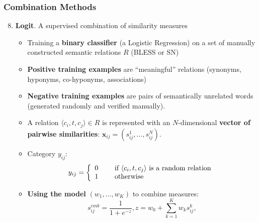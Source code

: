 \documentclass{beamer}
\begin{document}
\begin{frame}
\frametitle{Combination Methods}

\begin{enumerate}
  \setcounter{enumi}{7}
\item \textbf{Logit}. 
 A supervised combination of similarity measures 

\begin{itemize}
  \item  Training a \textbf{binary classifier} (a Logistic Regression) on a set of manually constructed
semantic relations $R$ (BLESS or SN)

\item \textbf{Positive training examples} are “meaningful” relations (synonyms,
hyponyms, co-hyponyms, associations)
\item \textbf{Negative training examples} are pairs of semantically unrelated words (generated randomly and verified manually).


  \item A relation $\langle c_i,t, c_j \rangle \in R$ is represented with an $N$-dimensional \textbf{vector of pairwise similarities}: $\mathbf{x}_{ij} = (s_{ij}^1,\ldots,s_{ij}^N)$. 

\item Category $y_{ij}$:
$$
y_{ij} = \left\{ 
  \begin{array}{l l}
    0 & \quad  \text{ if } \langle c_i,t, c_j \rangle \text{ is a random relation} 
    \\
    1 & \quad  \text{ otherwise }\\
  \end{array} \right
  .
$$

\item \textbf{Using the model} $(w_1,\ldots,w_K)$ to combine measures: 
$$s^{cmb}_{ij} = \frac{1}{1 + e^{-z}}, z = w_0 + \sum_{k=1}^K w_k s^k_{ij} , $$

\end{itemize}
\end{enumerate}

\end{frame}
\end{document}
